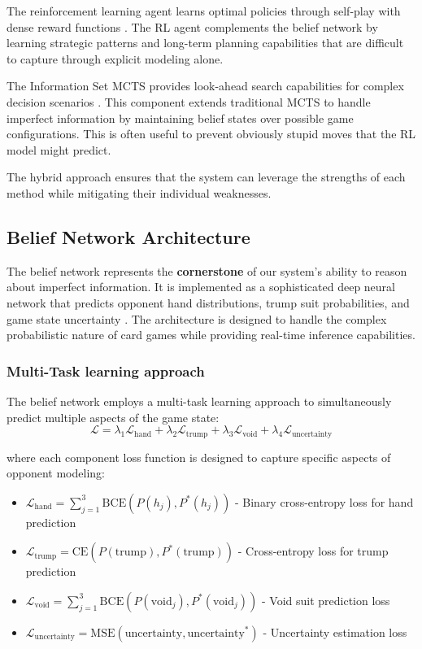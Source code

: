 \documentclass[conference]{IEEEtran}
\begin{document}
The reinforcement learning agent learns optimal policies through self-play with dense reward functions \cite{mnih2015human,schulman2017proximal,haarnoja2018soft}. The RL agent complements the belief network by learning strategic patterns and long-term planning capabilities that are difficult to capture through explicit modeling alone.

The Information Set MCTS provides look-ahead search capabilities for complex decision scenarios \cite{browne2012survey,whitehouse2016information,kowalski2017monte}. This component extends traditional MCTS to handle imperfect information by maintaining belief states over possible game configurations. This is often useful to prevent obviously stupid moves that the RL model might predict.

The hybrid approach ensures that the system can leverage the strengths of each method while mitigating their individual weaknesses.

\subsection{Belief Network Architecture}

The belief network represents the \textbf{cornerstone} of our system's ability to reason about imperfect information. It is implemented as a sophisticated deep neural network that predicts opponent hand distributions, trump suit probabilities, and game state uncertainty \cite{lecun2015deep,vaswani2017attention}. The architecture is designed to handle the complex probabilistic nature of card games while providing real-time inference capabilities.

\subsubsection{Multi-Task learning approach}

The belief network employs a multi-task learning approach to simultaneously predict multiple aspects of the game state:
\begin{equation}
\mathcal{L} = \lambda_1 \mathcal{L}_{\text{hand}} + \lambda_2 \mathcal{L}_{\text{trump}} + \lambda_3 \mathcal{L}_{\text{void}} + \lambda_4 \mathcal{L}_{\text{uncertainty}}
\end{equation}

where each component loss function is designed to capture specific aspects of opponent modeling:

\begin{itemize}
    \item $\mathcal{L}_{\text{hand}} = \sum_{j=1}^3 \text{BCE}(P(h_j), P^*(h_j))$ - Binary cross-entropy loss for hand prediction
    \item $\mathcal{L}_{\text{trump}} = \text{CE}(P(\text{trump}), P^*(\text{trump}))$ - Cross-entropy loss for trump prediction
    \item $\mathcal{L}_{\text{void}} = \sum_{j=1}^3 \text{BCE}(P(\text{void}_j), P^*(\text{void}_j))$ - Void suit prediction loss
    \item $\mathcal{L}_{\text{uncertainty}} = \text{MSE}(\text{uncertainty}, \text{uncertainty}^*)$ - Uncertainty estimation loss
\end{itemize}
\end{document}
